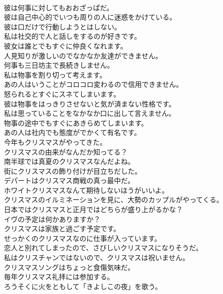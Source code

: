 \documentclass[8pt]{extreport}
\begin{document}
\begin{CJK}{UTF8}{min}
\\	彼は何事に対してもおおざっぱだ。	
\\	彼は自己中心的でいつも周りの人に迷惑をかけている。	
\\	彼は口だけで行動しようとはしない。	
\\	私は社交的で人と話しをするのが好きです。	
\\	彼女は誰とでもすぐに仲良くなれます。	
\\	人見知りが激しいのでなかなか友達ができません。	
\\	何事も三日坊主で長続きしません。	
\\	私は物事を割り切って考えます。	
\\	あの人はいうことがコロコロ変わるので信用できません。	
\\	怒られるとすぐにスネてしまいます。	
\\	彼は物事をはっきりさせないと気が済まない性格です。	
\\	私は思っていることをなかなか口に出して言えません。	
\\	物事の途中でもすぐにあきらめてしまいます。	
\\	あの人は社内でも態度がでかくて有名です。	
\\	今年もクリスマスがやってきた。	
\\	クリスマスの由来がなんだか知ってる？	
\\	南半球では真夏のクリスマスなんだよね。	
\\	街にクリスマスの飾り付けが目立ちだした。	
\\	デパートはクリスマス商戦の真っ最中だ。	
\\	ホワイトクリスマスなんて期待しないほうがいいよ。	
\\	クリスマスのイルミネーションを見に、大勢のカップルがやってくる。	
\\	日本ではクリスマスと正月ではどちらが盛り上がるかな？	
\\	イヴの予定は何かありますか？	
\\	クリスマスは家族と過ごす予定です。	
\\	せっかくのクリスマスなのに仕事が入っています。	
\\	恋人と別れてしまったので、さびしいクリスマスになりそうだ。	
\\	私はクリスチャンではないので、クリスマスは祝いません。	
\\	クリスマスソングはちょっと食傷気味だ。	
\\	毎年クリスマス礼拝には参加する。	
\\	ろうそくに火をともして「きよしこの夜」を歌う。	

\end{CJK}
\end{document}
